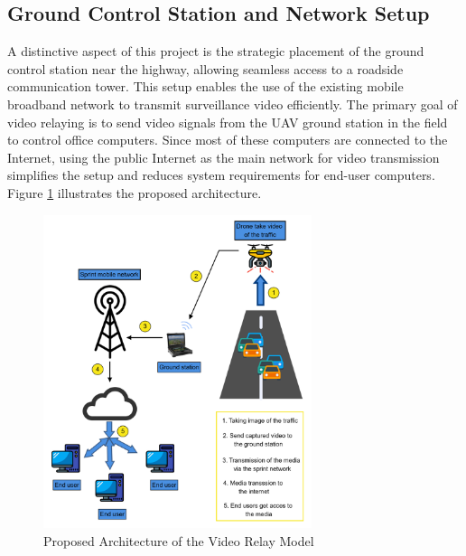 \subsection{Ground Control Station and Network Setup}
A distinctive aspect of this project is the strategic placement of the ground control station near the highway, allowing seamless access to a roadside communication tower. This setup enables the use of the existing mobile broadband network to transmit surveillance video efficiently. The primary goal of video relaying is to send video signals from the UAV ground station in the field to control office computers. Since most of these computers are connected to the Internet, using the public Internet as the main network for video transmission simplifies the setup and reduces system requirements for end-user computers. Figure \ref{fig:method2_architecture} illustrates the proposed architecture.

\vspace{\baselineskip} %

\begin{figure}[h]  %
    \centering
    \includegraphics[width=0.7\textwidth]{Figures/Chapter3/Method2/1.png} %
    \caption{Proposed Architecture of the Video Relay Model}
    \label{fig:method2_architecture} %
\end{figure}

\vspace{\baselineskip} %

